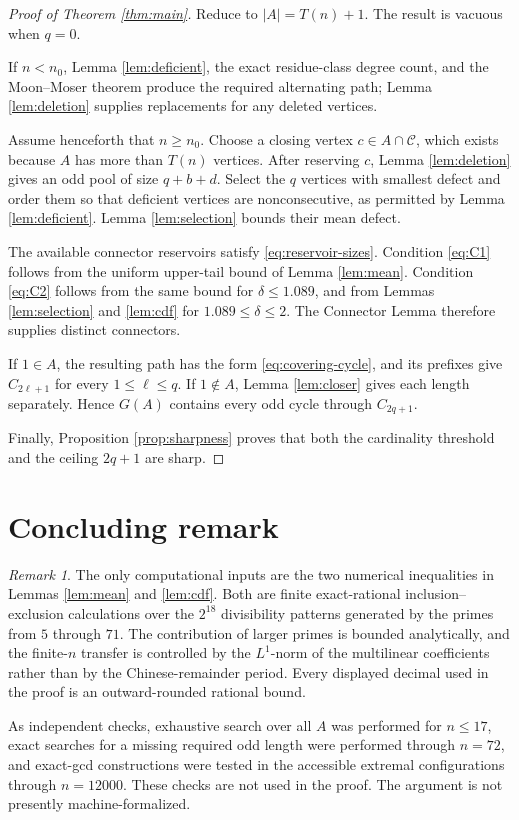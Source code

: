 \documentclass{article}
\theoremstyle{remark}
\newtheorem{remark}[theorem]{Remark}
\newcommand{\Ccal}{\mathcal{C}}
\begin{document}
\begin{proof}[Proof of Theorem \ref{thm:main}]
Reduce to \(|A|=T(n)+1\). The result is vacuous when \(q=0\).

If \(n<n_0\), Lemma \ref{lem:deficient}, the exact residue-class degree
count, and the Moon--Moser theorem produce the required alternating
path; Lemma \ref{lem:deletion} supplies replacements for any deleted
vertices.

Assume henceforth that \(n\geq n_0\). Choose a closing vertex
\(c\in A\cap\Ccal\), which exists because \(A\) has more than \(T(n)\)
vertices. After reserving \(c\), Lemma \ref{lem:deletion} gives an odd
pool of size \(q+b+d\). Select the \(q\) vertices with smallest defect
and order them so that deficient vertices are nonconsecutive, as
permitted by Lemma \ref{lem:deficient}. Lemma \ref{lem:selection}
bounds their mean defect.

The available connector reservoirs satisfy
\eqref{eq:reservoir-sizes}. Condition \eqref{eq:C1} follows from the
uniform upper-tail bound of Lemma \ref{lem:mean}. Condition
\eqref{eq:C2} follows from the same bound for
\(\delta\leq1.089\), and from Lemmas \ref{lem:selection} and
\ref{lem:cdf} for \(1.089\leq\delta\leq2\). The Connector Lemma
therefore supplies distinct connectors.

If \(1\in A\), the resulting path has the form
\eqref{eq:covering-cycle}, and its prefixes give \(C_{2\ell+1}\) for
every \(1\leq\ell\leq q\). If \(1\notin A\), Lemma
\ref{lem:closer} gives each length separately. Hence \(G(A)\) contains
every odd cycle through \(C_{2q+1}\).

Finally, Proposition \ref{prop:sharpness} proves that both the
cardinality threshold and the ceiling \(2q+1\) are sharp.
\end{proof}

\section{Concluding remark}

\begin{remark}
The only computational inputs are the two numerical inequalities in
Lemmas \ref{lem:mean} and \ref{lem:cdf}. Both are finite
exact-rational inclusion--exclusion calculations over the
\(2^{18}\) divisibility patterns generated by the primes from \(5\)
through \(71\). The contribution of larger primes is bounded
analytically, and the finite-\(n\) transfer is controlled by the
\(L^1\)-norm of the multilinear coefficients rather than by the
Chinese-remainder period. Every displayed decimal used in the proof is
an outward-rounded rational bound.

As independent checks, exhaustive search over all \(A\) was performed
for \(n\leq17\), exact searches for a missing required odd length were
performed through \(n=72\), and exact-gcd constructions were tested in
the accessible extremal configurations through \(n=12000\). These
checks are not used in the proof. The argument is not presently
machine-formalized.
\end{remark}
\end{document}
